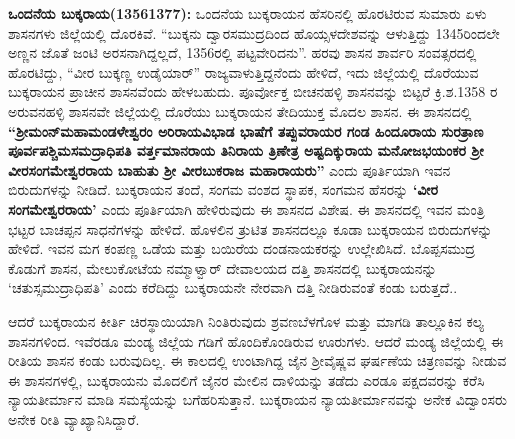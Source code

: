 \textbf{ಒಂದನೆಯ ಬುಕ್ಕರಾಯ(1356\general{\enginline{-}}1377):} ಒಂದನೆಯ ಬುಕ್ಕರಾಯನ ಹೆಸರಿನಲ್ಲಿ ಹೊರಟಿರುವ ಸುಮಾರು ಏಳು ಶಾಸನಗಳು ಜಿಲ್ಲೆಯಲ್ಲಿ ದೊರಕಿವೆ. “ಬುಕ್ಕನು ದ್ವಾರಸಮುದ್ರದಿಂದ ಹೊಯ್ಸಳದೇಶವನ್ನು ಆಳುತ್ತಿದ್ದು 1345ರಿಂದಲೇ ಅಣ್ಣನ ಜೊತೆ ಜಂಟಿ ಅರಸನಾಗಿದ್ದಲ್ಲದೆ, 1356ರಲ್ಲಿ ಪಟ್ಟವೇರಿದನು”. ಹರವು ಶಾಸನ ಶಾರ್ವರಿ ಸಂವತ್ಸರದಲ್ಲಿ ಹೊರಟಿದ್ದು, “ವೀರ ಬುಕ್ಕಣ್ಣ ಉಡೈಯಾರ್​” ರಾಜ್ಯವಾಳುತ್ತಿದ್ದನೆಂದು ಹೇಳಿದೆ, ಇದು ಜಿಲ್ಲೆಯಲ್ಲಿ ದೊರೆಯುವ ಬುಕ್ಕರಾಯನ ಪ್ರಾಚೀನ ಶಾಸನವೆಂದು ಹೇಳಬಹುದು. ಪೂರ್ವೋಕ್ತ ಬೀಚನಹಳ್ಳಿ ಶಾಸನವನ್ನು ಬಿಟ್ಟರೆ ಕ್ರಿ.ಶ.1358 ರ ಅರುವನಹಳ್ಳಿ ಶಾಸನವೇ ಜಿಲ್ಲೆಯಲ್ಲಿ ದೊರೆಯು ಬುಕ್ಕರಾಯನ ತೇದಿಯುಕ್ತ ಮೊದಲ ಶಾಸನ. ಈ ಶಾಸನದಲ್ಲಿ \textbf{“ಶ‍್ರೀಮಂನ್​ ಮಹಾಮಂಡಳೇಶ್ವರಂ ಅರಿರಾಯವಿಭಾಡ ಭಾಷೆಗೆ ತಪ್ಪುವರಾಯರ ಗಂಡ ಹಿಂದೂರಾಯ ಸುರತ್ರಾಣ ಪೂರ್ವಪಶ್ಚಿಮಸಮದ್ರಾಧಿಪತಿ\general{\break } ವರ್ತ್ತಮಾನರಾಯ ತಿನಿರಾಯ ತ್ರಿಣೇತ್ರ ಅಷ್ಟದಿಕ್ಕುರಾಯ ಮನೋಜಭಯಂಕರ ಶ‍್ರೀ ವೀರಸಂಗಮೇಶ್ವರರಾಯ ಬಾಹುತು ಶ‍್ರೀ ವೀರಬುಕರಾಜ ಮಹಾರಾಯರು”} ಎಂದು ಪೂರ್ತಿಯಾಗಿ ಇವನ ಬಿರುದುಗಳನ್ನು ನೀಡಿದೆ. ಬುಕ್ಕರಾಯನ ತಂದೆ, ಸಂಗಮ ವಂಶದ ಸ್ಥಾಪಕ, ಸಂಗಮನ ಹೆಸರನ್ನು \textbf{‘ವೀರ ಸಂಗಮೇಶ್ವರರಾಯ’} ಎಂದು ಪೂರ್ತಿಯಾಗಿ ಹೇಳಿರುವುದು ಈ ಶಾಸನದ ವಿಶೇಷ. ಈ ಶಾಸನದಲ್ಲಿ ಇವನ ಮಂತ್ರಿ ಭಟ್ಟರ ಬಾಚಪ್ಪನ ಸಾಧನೆಗಳನ್ನು ಹೇಳಿದೆ. ಹೊಳಲಿನ ತ್ರುಟಿತ ಶಾಸನದಲ್ಲೂ ಕೂಡಾ ಬುಕ್ಕರಾಯನ ಬಿರುದುಗಳನ್ನು ಹೇಳಿದೆ. ಇವನ ಮಗ ಕಂಪಣ್ಣ ಒಡೆಯ ಮತ್ತು ಬಯಿರೆಯ ದಂಡನಾಯಕರನ್ನು ಉಲ್ಲೇಖಿಸಿದೆ. ಬೊಪ್ಪಸಮುದ್ರ ಕೊಡುಗೆ ಶಾಸನ, ಮೇಲುಕೋಟೆಯ ನಮ್ಮಾಳ್ವಾರ್​ ದೇವಾಲಯದ ದತ್ತಿ ಶಾಸನದಲ್ಲಿ ಬುಕ್ಕರಾಯನನ್ನು ‘ಚತುಸ್ಸಮುದ್ರಾಧಿಪತಿ' ಎಂದು ಕರೆದಿದ್ದು ಬುಕ್ಕರಾಯನೇ ನೇರವಾಗಿ ದತ್ತಿ ನೀಡಿರುವಂತೆ ಕಂಡು ಬರುತ್ತದೆ..

ಆದರೆ ಬುಕ್ಕರಾಯನ ಕೀರ್ತಿ ಚಿರಸ್ಥಾಯಿಯಾಗಿ ನಿಂತಿರುವುದು ಶ್ರವಣಬೆಳಗೊಳ ಮತ್ತು ಮಾಗಡಿ ತಾಲ್ಲೂಕಿನ ಕಲ್ಯ ಶಾಸನಗಳಿಂದ. ಇವೆರಡೂ ಮಂಡ್ಯ ಜಿಲ್ಲೆಯ ಗಡಿಗೆ ಹೊಂದಿಕೊಂಡಿರುವ ಊರುಗಳು. ಆದರೆ ಮಂಡ್ಯ ಜಿಲ್ಲೆಯಲ್ಲಿ ಈ ರೀತಿಯ ಶಾಸನ ಕಂಡು ಬರುವುದಿಲ್ಲ. ಈ ಕಾಲದಲ್ಲಿ ಉಂಟಾಗಿದ್ದ ಜೈನ ಶ‍್ರೀವೈಷ್ಣವ ಘರ್ಷಣೆಯ ಚಿತ್ರಣವನ್ನು ನೀಡುವ ಈ ಶಾಸನಗಳಲ್ಲಿ, ಬುಕ್ಕರಾಯನು ಮೊದಲಿಗೆ ಜೈನರ ಮೇಲಿನ ದಾಳಿಯನ್ನು ತಡೆದು ಎರಡೂ ಪಕ್ಷದವರನ್ನು ಕರೆಸಿ ನ್ಯಾಯತೀರ್ಮಾನ ಮಾಡಿ ಸಮಸ್ಯೆಯನ್ನು ಬಗೆಹರಿಸುತ್ತಾನೆ. ಬುಕ್ಕರಾಯನ ನ್ಯಾಯತೀರ್ಮಾನವನ್ನು ಅನೇಕ ವಿದ್ವಾಂಸರು ಅನೇಕ ರೀತಿ ವ್ಯಾಖ್ಯಾನಿಸಿದ್ದಾರೆ.

